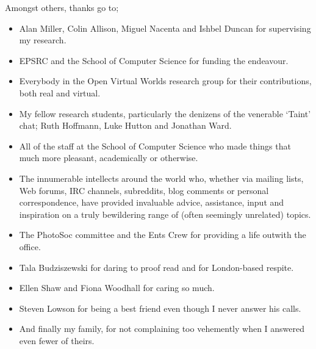 Amongst others, thanks go to;

\begin{itemize}

	\item Alan Miller, Colin Allison, Miguel Nacenta and Ishbel Duncan for supervising my research.
	
	\item EPSRC and the School of Computer Science for funding the endeavour.
	
	\item Everybody in the Open Virtual Worlds research group for their contributions, both real and virtual.
	
	\item My fellow research students, particularly the denizens of the venerable `Taint' chat; Ruth Hoffmann, Luke Hutton and Jonathan Ward.
	
	\item All of the staff at the School of Computer Science who made things that much more pleasant, academically or otherwise.
	
	\item The innumerable intellects around the world who, whether via mailing lists, Web forums, IRC channels, subreddits, blog comments or personal correspondence, have provided invaluable advice, assistance, input and inspiration on a truly bewildering range of (often seemingly unrelated) topics.
	
	\item The PhotoSoc committee and the Ents Crew for providing a life outwith the office.
	
	\item Tala Budziszewski for daring to proof read and for London-based respite.
	
	\item Ellen Shaw and Fiona Woodhall for caring so much.
	
	\item Steven Lowson for being a best friend even though I never answer his calls.
	
	\item And finally my family, for not complaining too vehemently when I answered even fewer of theirs.

\end{itemize}